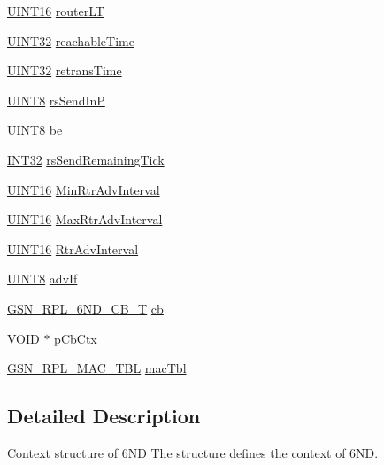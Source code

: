\begin{DoxyCompactItemize}
\item 
\hyperlink{a00660_ga09f1a1fb2293e33483cc8d44aefb1eb1}{UINT16} \hyperlink{a00194_afe72ac8c2aed197cadba13da2b74c4ee}{routerLT}
\item 
\hyperlink{a00660_gae1e6edbbc26d6fbc71a90190d0266018}{UINT32} \hyperlink{a00194_ada91f88c6f6c12258e42ca2ef41ab99a}{reachableTime}
\item 
\hyperlink{a00660_gae1e6edbbc26d6fbc71a90190d0266018}{UINT32} \hyperlink{a00194_a0befa25d646d3b1ef627c7b94d5a4918}{retransTime}
\item 
\hyperlink{a00660_gab27e9918b538ce9d8ca692479b375b6a}{UINT8} \hyperlink{a00194_acfd2bce448b81f1d1ac43333c004816e}{rsSendInP}
\item 
\hyperlink{a00660_gab27e9918b538ce9d8ca692479b375b6a}{UINT8} \hyperlink{a00194_adef8b71e042c787edf9b47fdad356ed4}{be}
\item 
\hyperlink{a00660_ga63021d67d54286c2163bcdb43a6f2569}{INT32} \hyperlink{a00194_a1bbfca54866e974d4e89a973b2a13b58}{rsSendRemainingTick}
\item 
\hyperlink{a00660_ga09f1a1fb2293e33483cc8d44aefb1eb1}{UINT16} \hyperlink{a00194_aa99832226388f64ed91a9d58bf2a862c}{MinRtrAdvInterval}
\item 
\hyperlink{a00660_ga09f1a1fb2293e33483cc8d44aefb1eb1}{UINT16} \hyperlink{a00194_ae3ebcc8321ee35e6297fd333661e089f}{MaxRtrAdvInterval}
\item 
\hyperlink{a00660_ga09f1a1fb2293e33483cc8d44aefb1eb1}{UINT16} \hyperlink{a00194_a9fd26f100ab970329ae6eee6a844ffe6}{RtrAdvInterval}
\item 
\hyperlink{a00660_gab27e9918b538ce9d8ca692479b375b6a}{UINT8} \hyperlink{a00194_a0847f9ba2c5ad3d017a322e7d4130523}{advIf}
\item 
\hyperlink{a00473_a746a04234ff43643fc1948ada254379c}{GSN\_\-RPL\_\-6ND\_\-CB\_\-T} \hyperlink{a00194_a8bde91b6ce377d59f0b80c03bdd469b9}{cb}
\item 
VOID $\ast$ \hyperlink{a00194_a040e2d4627baec5f0f81086400c1b66a}{pCbCtx}
\item 
\hyperlink{a00204}{GSN\_\-RPL\_\-MAC\_\-TBL} \hyperlink{a00194_a60c15c88d71e3f6b96d97da9fe5322a6}{macTbl}
\end{DoxyCompactItemize}


\subsection{Detailed Description}
Context structure of 6ND The structure defines the context of 6ND. 

